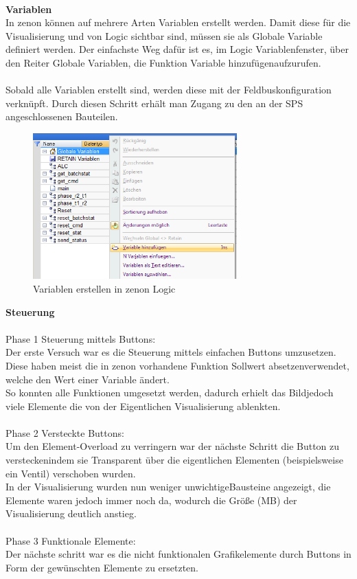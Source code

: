\\
\textbf{Variablen}\\
In zenon können auf mehrere Arten Variablen erstellt werden. Damit diese für die Visualisierung und von Logic sichtbar sind, müssen sie als Globale Variable definiert werden. Der einfachste Weg dafür ist es, im Logic Variablenfenster, über den Reiter  \glqq Globale Variablen\grqq, die Funktion \glqq Variable hinzufügen\grqq\space aufzurufen.\\
\\
Sobald alle Variablen erstellt sind, werden diese mit der Feldbuskonfiguration verknüpft. Durch diesen Schritt erhält man Zugang zu den an der \ac{SPS} angeschlossenen Bauteilen.

\newpage
\begin{figure}[h!]
  \centering
  \includegraphics[width=0.7\textwidth]{graphics/implementation/Variablen}
  \caption{Variablen erstellen in zenon Logic}
\end{figure}

\textbf{Steuerung}\\
\\
Phase 1 Steuerung mittels Buttons:\\
	Der erste Versuch war es die Steuerung mittels einfachen Buttons umzusetzen. Diese haben meist die in zenon vorhandene Funktion  \glqq Sollwert absetzen\grqq\space  verwendet, welche den Wert einer Variable ändert.\\
	So konnten alle Funktionen umgesetzt werden, dadurch erhielt das  \glqq Bild\grqq\space  jedoch viele Elemente die von der Eigentlichen Visualisierung ablenkten.\\
\\
Phase 2 Versteckte Buttons:\\
	Um den Element-Overload zu verringern war der nächste Schritt die Button zu  \glqq verstecken\grqq\space  indem sie Transparent über die eigentlichen Elementen (beispielsweise ein Ventil) verschoben wurden.\\
	In der Visualisierung wurden nun weniger  \glqq unwichtige\grqq\space  Bausteine angezeigt, die Elemente waren jedoch immer noch da, wodurch die Größe (MB) der Visualisierung deutlich anstieg.\\
\\
Phase 3 Funktionale Elemente:\\
	Der nächste schritt war es die nicht funktionalen Grafikelemente durch Buttons in Form der gewünschten Elemente zu ersetzten.\\
\\

